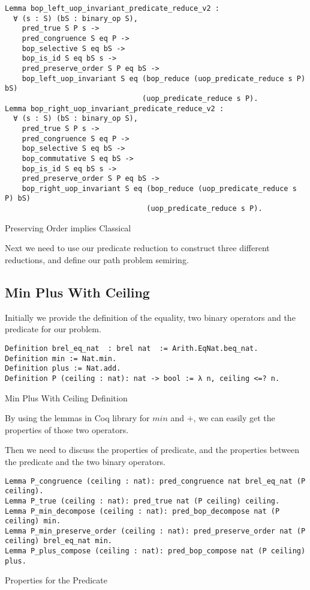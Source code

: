 \begin{listing}[H]
\begin{verbatim}
Lemma bop_left_uop_invariant_predicate_reduce_v2 :
  ∀ (s : S) (bS : binary_op S),
    pred_true S P s ->
    pred_congruence S eq P -> 
    bop_selective S eq bS ->
    bop_is_id S eq bS s ->        
    pred_preserve_order S P eq bS ->
    bop_left_uop_invariant S eq (bop_reduce (uop_predicate_reduce s P) bS) 
                                (uop_predicate_reduce s P).
Lemma bop_right_uop_invariant_predicate_reduce_v2 :
  ∀ (s : S) (bS : binary_op S),
    pred_true S P s ->
    pred_congruence S eq P -> 
    bop_selective S eq bS ->
    bop_commutative S eq bS ->
    bop_is_id S eq bS s ->        
    pred_preserve_order S P eq bS ->
    bop_right_uop_invariant S eq (bop_reduce (uop_predicate_reduce s P) bS) 
                                 (uop_predicate_reduce s P).
\end{verbatim}
\caption{Preserving Order implies Classical} 
\label{coq:proof:preserve_order_classic}
\end{listing}
Next we need to use our predicate reduction to construct three different reductions, and define our path problem semiring.
\subsection{Min Plus With Ceiling}
Initially we provide the definition of the equality, two binary operators and the predicate for our problem.
\begin{listing}[H]
\begin{verbatim}
Definition brel_eq_nat  : brel nat  := Arith.EqNat.beq_nat.
Definition min := Nat.min.
Definition plus := Nat.add.
Definition P (ceiling : nat): nat -> bool := λ n, ceiling <=? n.
\end{verbatim}
\caption{Min Plus With Ceiling Definition} 
\label{coq:def:min_plus_with_ceiling}
\end{listing}

By using the lemmas in Coq library for $min$ and $+$, we can easily get the properties of those two operators.

Then we need to discuss the properties of predicate, and the properties between the predicate and the two binary operators.
\begin{listing}[H]
\begin{verbatim}
Lemma P_congruence (ceiling : nat): pred_congruence nat brel_eq_nat (P ceiling).
Lemma P_true (ceiling : nat): pred_true nat (P ceiling) ceiling.
Lemma P_min_decompose (ceiling : nat): pred_bop_decompose nat (P ceiling) min.
Lemma P_min_preserve_order (ceiling : nat): pred_preserve_order nat (P ceiling) brel_eq_nat min.
Lemma P_plus_compose (ceiling : nat): pred_bop_compose nat (P ceiling) plus.
\end{verbatim}
\caption{Properties for the Predicate} 
\label{coq:proof:predicate_properties}
\end{listing}

